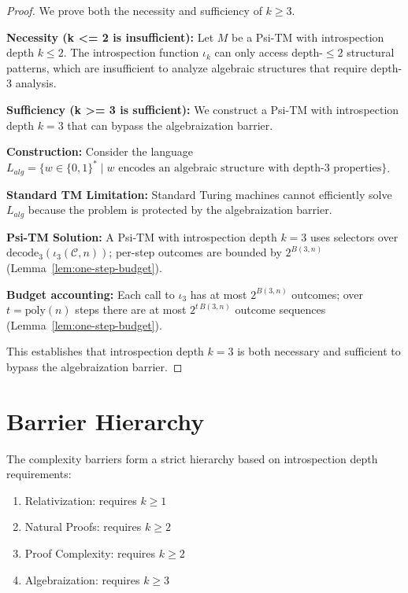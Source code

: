 \begin{proof}
We prove both the necessity and sufficiency of $k \geq 3$.

\textbf{Necessity (k <= 2 is insufficient):}
Let $M$ be a Psi-TM with introspection depth $k \leq 2$. The introspection function $\iota_k$ can only access depth-$\leq$2 structural patterns, which are insufficient to analyze algebraic structures that require depth-3 analysis.

\textbf{Sufficiency (k >= 3 is sufficient):}
We construct a Psi-TM with introspection depth $k = 3$ that can bypass the algebraization barrier.

\textbf{Construction:}
Consider the language $L_{alg} = \{w \in \{0,1\}^* \mid w \text{ encodes an algebraic structure with depth-3 properties}\}$.

\textbf{Standard TM Limitation:}
Standard Turing machines cannot efficiently solve $L_{alg}$ because the problem is protected by the algebraization barrier.

\textbf{Psi-TM Solution:}
A Psi-TM with introspection depth $k = 3$ uses selectors over $\mathrm{decode}_3(\iota_3(\mathcal{C},n))$; per-step outcomes are bounded by $2^{B(3,n)}$ (Lemma~\ref{lem:one-step-budget}).

\textbf{Budget accounting:}
Each call to $\iota_3$ has at most $2^{B(3,n)}$ outcomes; over $t=\mathrm{poly}(n)$ steps there are at most $2^{t\,B(3,n)}$ outcome sequences (Lemma~\ref{lem:one-step-budget}).

This establishes that introspection depth $k = 3$ is both necessary and sufficient to bypass the algebraization barrier.
\end{proof}

\section{Barrier Hierarchy}

\begin{theorem}
The complexity barriers form a strict hierarchy based on introspection depth requirements:
\begin{enumerate}
\item Relativization: requires $k \geq 1$
\item Natural Proofs: requires $k \geq 2$
\item Proof Complexity: requires $k \geq 2$
\item Algebraization: requires $k \geq 3$
\end{enumerate}
\end{theorem}

